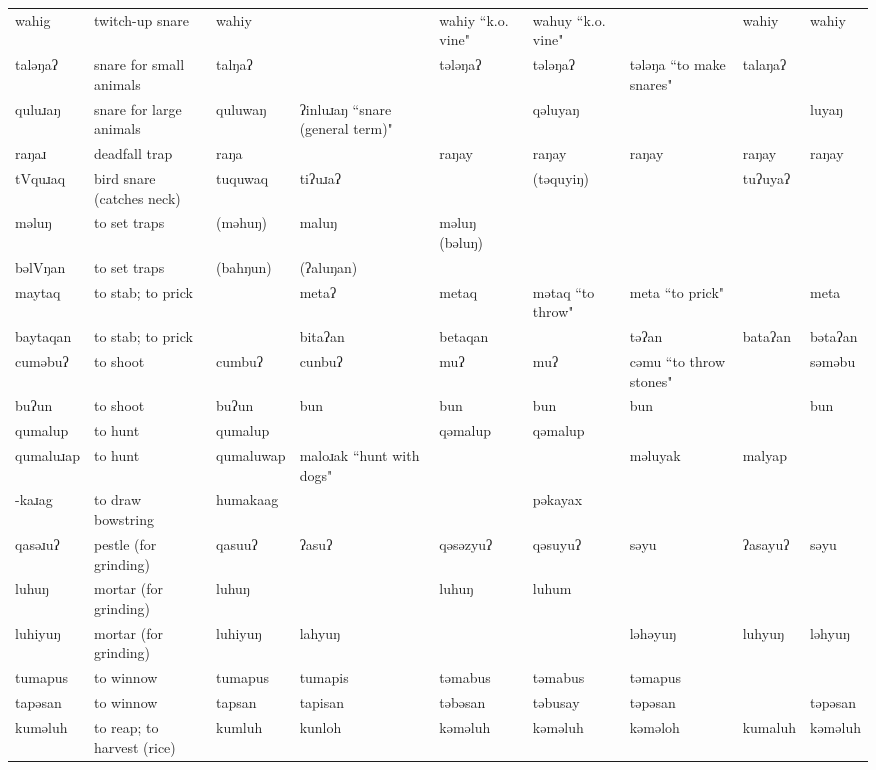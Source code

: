 \begin{landscape}
\begin{longtable}{*{9}{p{}}}
\text{*}wahig & twitch-up snare & wahiy &  & wahiy ``k.o. vine" & wahuy ``k.o. vine" &  & wahiy & wahiy\\
\text{*}taləŋaʔ & snare for small animals & talŋaʔ &  & tələŋaʔ & tələŋaʔ & tələŋa ``to make snares" & talaŋaʔ & \\
\text{*}quluɹaŋ & snare for large animals & quluwaŋ & ʔinluɹaŋ ``snare (general term)" &  & qəluyaŋ &  &  & luyaŋ\\
\text{*}raŋaɹ & deadfall trap & raŋa &  & raŋay & raŋay & raŋay & raŋay & raŋay\\
\text{*}tVquɹaq & bird snare (catches neck) & tuquwaq & tiʔuɹaʔ &  & (təquyiŋ) &  & tuʔuyaʔ & \\
\text{*}məluŋ & to set traps & (məhuŋ) & maluŋ & məluŋ (bəluŋ) &  &  &  & \\
\text{*}bəlVŋan & to set traps & (bahŋun) & (ʔaluŋan) &  &  &  &  & \\
\text{*}maytaq & to stab; to prick &  & metaʔ & metaq & mətaq ``to throw" & meta ``to prick" &  & meta\\
\text{*}baytaqan & to stab; to prick &  & bitaʔan & betaqan &  & təʔan & bataʔan & bətaʔan\\
\text{*}cuməbuʔ & to shoot & cumbuʔ & cunbuʔ & muʔ & muʔ & cəmu ``to throw stones" &  & səməbu\\
\text{*}buʔun & to shoot & buʔun & bun & bun & bun & bun &  & bun\\
\text{*}qumalup & to hunt & qumalup &  & qəmalup & qəmalup &  &  & \\
\text{*}qumaluɹap & to hunt & qumaluwap & maloɹak ``hunt with dogs" &  &  & məluyak & malyap & \\
\text{*}-kaɹag & to draw bowstring & humakaag &  &  & pəkayax &  &  & \\
\text{*}qasəɹuʔ & pestle (for grinding) & qasuuʔ & ʔasuʔ & qəsəzyuʔ & qəsuyuʔ & səyu & ʔasayuʔ & səyu\\
\text{*}luhuŋ & mortar (for grinding) & luhuŋ &  & luhuŋ & luhum &  &  & \\
\text{*}luhiyuŋ & mortar (for grinding) & luhiyuŋ & lahyuŋ &  &  & ləhəyuŋ & luhyuŋ & ləhyuŋ\\
\text{*}tumapus & to winnow & tumapus & tumapis & təmabus & təmabus & təmapus &  & \\
\text{*}tapəsan & to winnow & tapsan & tapisan & təbəsan & təbusay & təpəsan &  & təpəsan\\
\text{*}kuməluh & to reap; to harvest (rice) & kumluh & kunloh & kəməluh & kəməluh & kəməloh & kumaluh & kəməluh\\

\end{longtable}
\end{landscape}
